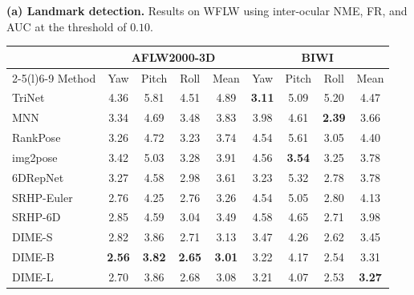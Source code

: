\documentclass[10pt,journal,compsoc]{IEEEtran}
\newcommand{\BestScore}[1]{\textcolor{DIMEBestText}{#1}}
\newcommand{\SecondScore}[1]{\textcolor{DIMESecondText}{#1}}
\begin{document}
\begin{table}[t]
\begin{minipage}[t]{0.250\textwidth}
    \vspace{0.7mm}
    \parbox[t][1.55cm][t]{\linewidth}{%
      \footnotesize
      \textbf{(a) Landmark detection.}
      Results on WFLW using inter-ocular NME, FR, and AUC at the threshold
      of $0.10$.
    }
  \end{minipage}
  \hfill
  \begin{minipage}[t]{0.425\textwidth}
    \vspace{0pt}
    \centering
    \GeometryTableFormat

    \begin{tabular*}{\linewidth}{
      @{\extracolsep{\fill}}lcccccccc@{}
    }
      \toprule
      & \multicolumn{4}{c}{AFLW2000-3D \cite{zhu2019face}}
      & \multicolumn{4}{c}{BIWI \cite{hempel20226d}} \\
      \cmidrule(lr){2-5}\cmidrule(l){6-9}
      Method
      & Yaw & Pitch & Roll & Mean
      & Yaw & Pitch & Roll & Mean \\
      \midrule
      TriNet \cite{cao2021vector}
      & 4.36 & 5.81 & 4.51 & 4.89
      & \BestScore{\textbf{3.11}} & 5.09 & 5.20 & 4.47 \\
      MNN \cite{valle2020multi}
      & 3.34 & 4.69 & 3.48 & 3.83
      & 3.98 & 4.61 & \BestScore{\textbf{2.39}} & 3.66 \\
      RankPose \cite{dai2020rankpose}
      & 3.26 & 4.72 & 3.23 & 3.74
      & 4.54 & 5.61 & 3.05 & 4.40 \\
      img2pose \cite{albiero2021img2pose}
      & 3.42 & 5.03 & 3.28 & 3.91
      & 4.56 & \BestScore{\textbf{3.54}} & 3.25 & 3.78 \\
      6DRepNet \cite{hempel20226d}
      & 3.27 & 4.58 & 2.98 & 3.61
      & 3.23 & 5.32 & 2.78 & 3.78 \\
      SRHP-Euler \cite{cobo2024representation}
      & 2.76 & 4.25 & 2.76 & 3.26
      & 4.54 & 5.05 & 2.80 & 4.13 \\
      SRHP-6D \cite{cobo2024representation}
      & 2.85 & 4.59 & 3.04 & 3.49
      & 4.58 & 4.65 & 2.71 & 3.98 \\
      \midrule
      DIME-S
      & 2.82 & \SecondScore{3.86} & 2.71 & 3.13
      & 3.47 & 4.26 & 2.62 & 3.45 \\
      DIME-B
      & \BestScore{\textbf{2.56}}
      & \BestScore{\textbf{3.82}}
      & \BestScore{\textbf{2.65}}
      & \BestScore{\textbf{3.01}}
      & 3.22 & 4.17 & 2.54
      & \SecondScore{3.31} \\
      DIME-L
      & \SecondScore{2.70}
      & \SecondScore{3.86}
      & \SecondScore{2.68}
      & \SecondScore{3.08}
      & \SecondScore{3.21}
      & \SecondScore{4.07}
      & \SecondScore{2.53}
      & \BestScore{\textbf{3.27}} \\
      \bottomrule
    \end{tabular*}


\end{minipage}
\end{table}
\end{document}
